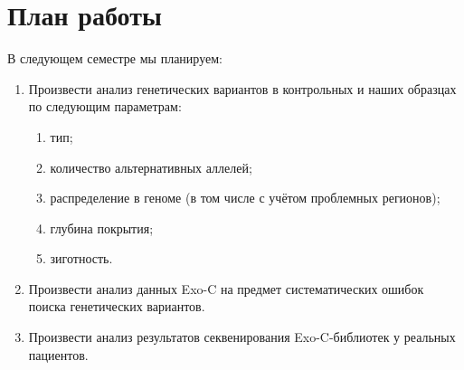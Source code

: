 \documentclass[a4paper,14pt]{extarticle}
\begin{document}
\section{План работы}

В следующем семестре мы планируем:

\begin{enumerate}
\item Произвести анализ генетических вариантов в контрольных и наших образцах по следующим параметрам:
\begin{enumerate}
\item тип;
\item количество альтернативных аллелей;
 \item распределение в геноме (в том числе с учётом проблемных регионов);
 \item глубина покрытия;
 \item зиготность.
\end{enumerate}

\item Произвести анализ данных Exo-C на предмет систематических ошибок поиска генетических вариантов.

\item Произвести анализ результатов секвенирования Exo-C\hyp{}библиотек у реальных пациентов.

\end{enumerate}

\newpage

% 


\newpage

\appendix
\end{document}
